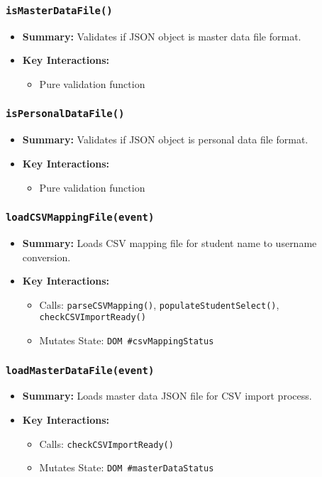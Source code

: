\documentclass[11pt,letterpaper]{article}
\begin{document}
\subsubsection{\texttt{isMasterDataFile()}}
\begin{itemize}
    \item \textbf{Summary:} Validates if JSON object is master data file format.
    \item \textbf{Key Interactions:}
    \begin{itemize}
        \item Pure validation function
    \end{itemize}
\end{itemize}

\subsubsection{\texttt{isPersonalDataFile()}}
\begin{itemize}
    \item \textbf{Summary:} Validates if JSON object is personal data file format.
    \item \textbf{Key Interactions:}
    \begin{itemize}
        \item Pure validation function
    \end{itemize}
\end{itemize}

\subsubsection{\texttt{loadCSVMappingFile(event)}}
\begin{itemize}
    \item \textbf{Summary:} Loads CSV mapping file for student name to username conversion.
    \item \textbf{Key Interactions:}
    \begin{itemize}
        \item Calls: \texttt{parseCSVMapping()}, \texttt{populateStudentSelect()}, \texttt{checkCSVImportReady()}
        \item Mutates State: \texttt{DOM \#csvMappingStatus}
    \end{itemize}
\end{itemize}

\subsubsection{\texttt{loadMasterDataFile(event)}}
\begin{itemize}
    \item \textbf{Summary:} Loads master data JSON file for CSV import process.
    \item \textbf{Key Interactions:}
    \begin{itemize}
        \item Calls: \texttt{checkCSVImportReady()}
        \item Mutates State: \texttt{DOM \#masterDataStatus}
    \end{itemize}
\end{itemize}
\end{document}
